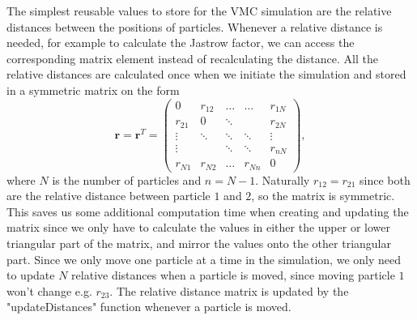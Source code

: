 \documentclass[../main.tex]{subfiles}
\begin{document}
The simplest reusable values to store for the VMC simulation are the relative distances between the positions of particles. Whenever a relative distance is needed, for example to calculate the Jastrow factor, we can access the corresponding matrix element instead of recalculating the distance. All the relative distances are calculated once when we initiate the simulation and stored in a symmetric matrix on the form
\begin{equation}
    \mathbf{r} = \mathbf{r}^T =
    \left( \begin{array}{ccccc} 0 & r_{12} & \dots & \dots & r_{1N}\\
                                r_{21} & 0 & \ddots &  & r_{2N}\\
                                \vdots & \ddots & \ddots & \ddots & \vdots\\
                                \vdots &  & \ddots & \ddots & r_{nN}\\
                                r_{N1} & r_{N2} & \dots & r_{Nn} & 0

             \end{array} \right),
\end{equation}
where $N$ is the number of particles and $n=N-1$. Naturally $r_{12} = r_{21}$ since both are the relative distance between particle $1$ and $2$, so the matrix is symmetric. This saves us some additional computation time when creating and updating the matrix since we only have to calculate the values in either the upper or lower triangular part of the matrix, and mirror the values onto the other triangular part. Since we only move one particle at a time in the simulation, we only need to update $N$ relative distances when a particle is moved, since moving particle $1$ won't change e.g. $r_{23}$. The relative distance matrix is updated by the "updateDistances" function whenever a particle is moved.
\end{document}
